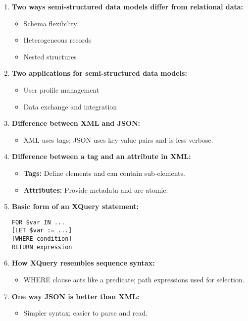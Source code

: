 \documentclass[12pt]{article}
\begin{document}
\begin{enumerate}
    \item \textbf{Two ways semi-structured data models differ from relational data:}
    \begin{itemize}
        \item Schema flexibility
        \item Heterogeneous records
        \item Nested structures
    \end{itemize}

    \item \textbf{Two applications for semi-structured data models:}
    \begin{itemize}
        \item User profile management
        \item Data exchange and integration
    \end{itemize}

    \item \textbf{Difference between XML and JSON:}
    \begin{itemize}
        \item XML uses tags; JSON uses key-value pairs and is less verbose.
    \end{itemize}

    \item \textbf{Difference between a tag and an attribute in XML:}
    \begin{itemize}
        \item \textbf{Tags:} Define elements and can contain sub-elements.
        \item \textbf{Attributes:} Provide metadata and are atomic.
    \end{itemize}

    \item \textbf{Basic form of an XQuery statement:}
    \begin{verbatim}
FOR $var IN ...
[LET $var := ...]
[WHERE condition]
RETURN expression
    \end{verbatim}

    \item \textbf{How XQuery resembles sequence syntax:}
    \begin{itemize}
        \item WHERE clause acts like a predicate; path expressions used for selection.
    \end{itemize}

    \item \textbf{One way JSON is better than XML:}
    \begin{itemize}
        \item Simpler syntax; easier to parse and read.
    \end{itemize}


\end{enumerate}
\end{document}

